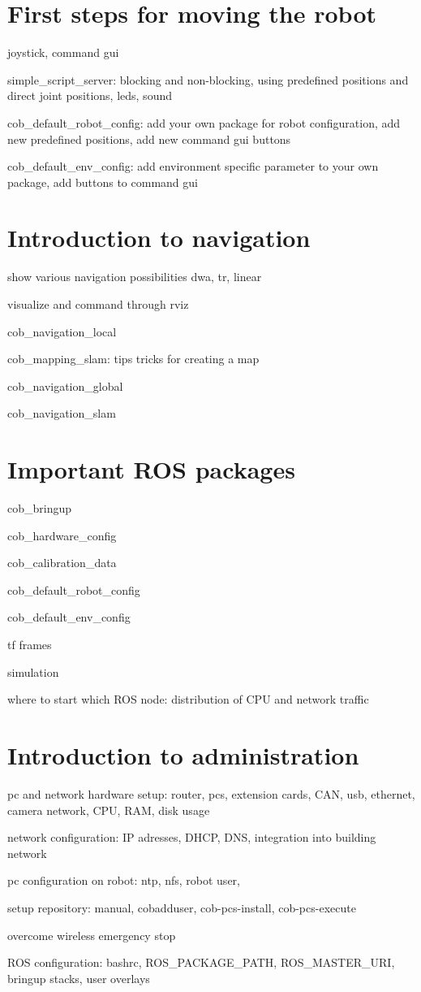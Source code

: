 \documentclass[12pt,twoside]{report}
\begin{document}
\section{First steps for moving the robot}
joystick, command gui

simple\_script\_server: blocking and non-blocking, using predefined positions and direct joint positions, leds, sound

cob\_default\_robot\_config: add your own package for robot configuration, add new predefined positions, add new command gui buttons

cob\_default\_env\_config: add environment specific parameter to your own package, add buttons to command gui

\section{Introduction to navigation}
show various navigation possibilities dwa, tr, linear

visualize and command through rviz

cob\_navigation\_local

cob\_mapping\_slam: tips tricks for creating a map

cob\_navigation\_global

cob\_navigation\_slam

\section{Important ROS packages}
cob\_bringup

cob\_hardware\_config

cob\_calibration\_data

cob\_default\_robot\_config

cob\_default\_env\_config

tf frames

simulation

where to start which ROS node: distribution of CPU and network traffic

\section{Introduction to administration}
pc and network hardware setup: router, pcs, extension cards, CAN, usb, ethernet, camera network, CPU, RAM, disk usage

network configuration: IP adresses, DHCP, DNS, integration into building network

pc configuration on robot: ntp, nfs, robot user, 

setup repository: manual, cobadduser, cob-pcs-install, cob-pcs-execute

overcome wireless emergency stop

ROS configuration: bashrc, ROS\_PACKAGE\_PATH, ROS\_MASTER\_URI, bringup stacks, user overlays
\end{document}
